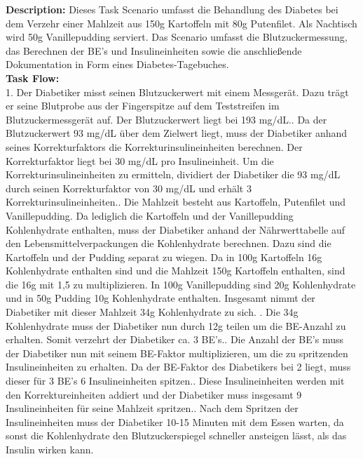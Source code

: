 \textbf{Description: } Dieses Task Scenario umfasst die Behandlung des Diabetes bei dem Verzehr einer Mahlzeit aus 150g Kartoffeln mit 80g Putenfilet. Als Nachtisch wird 50g Vanillepudding serviert. Das Scenario umfasst die Blutzuckermessung, das Berechnen der BE's und Insulineinheiten sowie die anschließende Dokumentation in Form eines Diabetes-Tagebuches.\\
\textbf{Task Flow:}\\
1. Der Diabetiker misst seinen Blutzuckerwert mit einem Messgerät. Dazu trägt er seine Blutprobe aus der Fingerspitze auf dem Teststreifen im Blutzuckermessgerät auf. Der Blutzuckerwert liegt bei 193 mg/dL.. Da der Blutzuckerwert 93 mg/dL über dem Zielwert liegt, muss der Diabetiker anhand seines Korrekturfaktors die Korrekturinsulineinheiten berechnen. Der Korrekturfaktor liegt bei 30 mg/dL pro Insulineinheit. Um die Korrekturinsulineinheiten zu ermitteln, dividiert der Diabetiker die 93 mg/dL durch seinen Korrekturfaktor von 30 mg/dL und erhält 3 Korrekturinsulineinheiten.. Die Mahlzeit besteht aus Kartoffeln, Putenfilet und Vanillepudding. Da lediglich die Kartoffeln und der Vanillepudding Kohlenhydrate enthalten, muss der Diabetiker anhand der Nährwerttabelle auf den Lebensmittelverpackungen die Kohlenhydrate berechnen. Dazu sind die Kartoffeln und der Pudding separat zu wiegen. Da in 100g Kartoffeln 16g Kohlenhydrate enthalten sind und die Mahlzeit 150g Kartoffeln enthalten, sind die 16g mit 1,5 zu multiplizieren. In 100g Vanillepudding sind 20g Kohlenhydrate und in 50g Pudding 10g Kohlenhydrate enthalten. Insgesamt nimmt der Diabetiker mit dieser Mahlzeit 34g Kohlenhydrate zu sich. . Die 34g Kohlenhydrate muss der Diabetiker nun durch 12g teilen um die BE-Anzahl zu erhalten. Somit verzehrt der Diabetiker ca. 3 BE's.. Die Anzahl der BE's muss der Diabetiker nun mit seinem BE-Faktor multiplizieren, um die zu spritzenden Insulineinheiten zu erhalten. Da der BE-Faktor des Diabetikers bei 2 liegt, muss dieser für 3 BE's 6 Insulineinheiten spitzen.. Diese Insulineinheiten werden mit den Korrektureinheiten addiert und der Diabetiker muss insgesamt 9 Insulineinheiten für seine Mahlzeit spritzen.. Nach dem Spritzen der Insulineinheiten muss der Diabetiker 10-15 Minuten mit dem Essen warten, da sonst die Kohlenhydrate den Blutzuckerspiegel schneller ansteigen lässt, als das Insulin wirken kann. \newline
